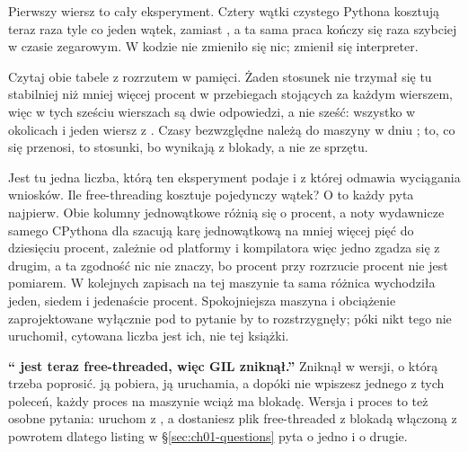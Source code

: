 \noindent
Pierwszy wiersz to cały eksperyment. Cztery wątki czystego Pythona kosztują
teraz  raza tyle co jeden wątek, zamiast
, a ta sama praca kończy się
 raza szybciej w czasie zegarowym. W kodzie nie
zmieniło się nic; zmienił się interpreter.

\begin{warning}
Czytaj obie tabele z rozrzutem w pamięci. Żaden stosunek nie trzymał się tu
stabilniej niż mniej więcej  procent w
 przebiegach stojących za każdym wierszem, więc w tych
sześciu wierszach są dwie odpowiedzi, a nie sześć: wszystko w okolicach
 i jeden wiersz z
. Czasy bezwzględne należą do maszyny
 w dniu ; to, co się przenosi, to
stosunki, bo wynikają z blokady, a nie ze sprzętu.

Jest tu jedna liczba, którą ten eksperyment podaje i z której odmawia
wyciągania wniosków. Ile free-threading kosztuje pojedynczy wątek? O to każdy
pyta najpierw. Obie kolumny jednowątkowe różnią się o
 procent, a noty wydawnicze samego CPythona
dla \pypatch{} szacują karę jednowątkową na mniej więcej pięć do dziesięciu
procent, zależnie od platformy i kompilatora \dash{} więc jedno zgadza się z
drugim, a ta zgodność nic nie znaczy, bo 
procent przy rozrzucie  procent nie jest pomiarem. W kolejnych
zapisach na tej maszynie ta sama różnica wychodziła jeden, siedem i jedenaście
procent. Spokojniejsza maszyna i obciążenie zaprojektowane wyłącznie pod to
pytanie by to rozstrzygnęły; póki nikt tego nie uruchomił, cytowana liczba
jest ich, nie tej książki.
\end{warning}


\begin{trapbox}
\textbf{\enquote{\pyver{} jest teraz free-threaded, więc GIL zniknął.}}
Zniknął w wersji, o którą trzeba poprosić.  ją pobiera,  ją uruchamia, a dopóki nie
wpiszesz jednego z tych poleceń, każdy proces na maszynie wciąż ma blokadę.
Wersja i proces to też osobne pytania: uruchom  z
, a dostaniesz plik free-threaded z blokadą włączoną z
powrotem \dash{} dlatego listing w \S\ref{sec:ch01-questions} pyta o jedno i
o drugie.
\end{trapbox}

